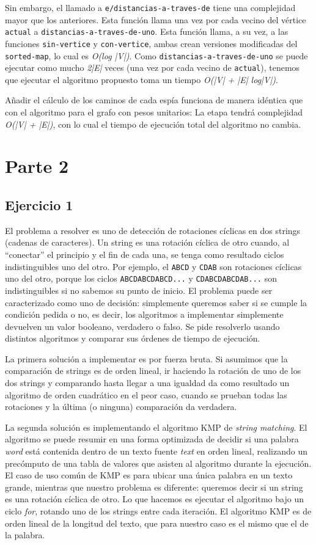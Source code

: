 \documentclass{article}
\begin{document}
Sin embargo, el llamado a \texttt{e/distancias-a-traves-de} tiene una complejidad mayor que los anteriores. Esta función llama una vez por cada vecino del vértice \texttt{actual} a \texttt{distancias-a-traves-de-uno}. Esta función llama, a su vez, a las funciones \texttt{sin-vertice} y \texttt{con-vertice}, ambas crean versiones modificadas del \texttt{sorted-map}, lo cual es \textit{O(log |V|)}. Como \texttt{distancias-a-traves-de-uno} se puede ejecutar como mucho \textit{2|E|} veces (una vez por cada vecino de \texttt{actual}), tenemos que ejecutar el algoritmo propuesto toma un tiempo \textit{O(|V| + |E| log|V|)}.

Añadir el cálculo de los caminos de cada espía funciona de manera idéntica que con el algoritmo para el grafo con pesos unitarios: La etapa tendrá complejidad \textit{O(|V| + |E|)}, con lo cual el tiempo de ejecución total del algoritmo no cambia.

\newpage
\section{Parte 2}
\subsection{Ejercicio 1}
El problema a resolver es uno de detección de rotaciones cíclicas en dos strings (cadenas de caracteres). Un string es una rotación cíclica de otro cuando, al ``conectar'' el principio y el fin de cada una, se tenga como resultado ciclos indistinguibles uno del otro. Por ejemplo, el \texttt{ABCD} y \texttt{CDAB} son rotaciones cíclicas uno del otro, porque los ciclos \texttt{ABCDABCDABCD...} y \texttt{CDABCDABCDAB...} son indistinguibles si no sabemos su punto de inicio. El problema puede ser caracterizado como uno de decisión: simplemente queremos saber si se cumple la condición pedida o no, es decir, los algoritmos a implementar simplemente devuelven un valor booleano, verdadero o falso. Se pide resolverlo usando distintos algoritmos y comparar sus órdenes de tiempo de ejecución.

La primera solución a implementar es por fuerza bruta. Si asumimos que la comparación de strings es de orden lineal, ir haciendo la rotación de uno de los dos strings y comparando hasta llegar a una igualdad da como resultado un algoritmo de orden cuadrático en el peor caso, cuando se prueban todas las rotaciones y la última (o ninguna) comparación da verdadera.

La segunda solución es implementando el algoritmo KMP de \textit{string matching}. El algoritmo se puede resumir en una forma optimizada de decidir si una palabra \textit{word} está contenida dentro de un texto fuente \textit{text} en orden lineal, realizando un precómputo de una tabla de valores que asisten al algoritmo durante la ejecución. El caso de uso común de KMP es para ubicar una única palabra en un texto grande, mientras que nuestro problema es diferente: queremos decir si un string es una rotación cíclica de otro. Lo que hacemos es ejecutar el algoritmo bajo un ciclo \textit{for}, rotando uno de los strings entre cada iteración. El algoritmo KMP es de orden lineal de la longitud del texto, que para nuestro caso es el mismo que el de la palabra.
\end{document}
